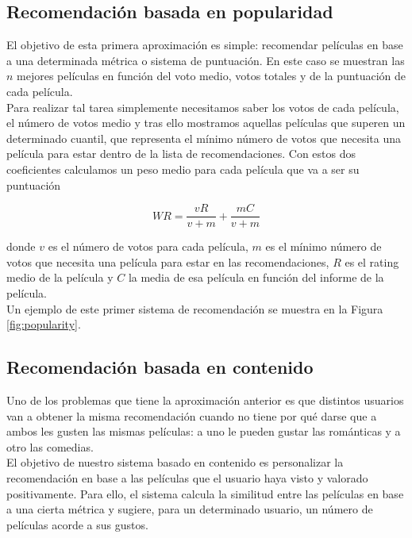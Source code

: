 	
		\subsection{Recomendación basada en popularidad}
	
			El objetivo de esta primera aproximación es simple: recomendar películas en base a una determinada métrica o sistema de puntuación. En este caso se muestran las $n$ mejores películas en función del voto medio, votos totales y de la puntuación de cada película. \\
			
			Para realizar tal tarea simplemente necesitamos saber los votos de cada película, el número de votos medio y tras ello mostramos aquellas películas que superen un determinado cuantil, que representa el mínimo número de votos que necesita una película para estar dentro de la lista de recomendaciones. Con estos dos coeficientes calculamos un peso medio para cada película que va a ser su puntuación
			
			$$ WR = \frac{v R}{v+m} + \frac{m C}{v+m} $$
			
			donde $v$ es el número de votos para cada película, $m$ es el mínimo número de votos que necesita una película para estar en las recomendaciones, $R$ es el rating medio de la película y $C$ la media de esa película en función del informe de la película. \\
			
			Un ejemplo de este primer sistema de recomendación se muestra en la Figura \ref{fig:popularity}.
			
		
		\subsection{Recomendación basada en contenido}
		
			Uno de los problemas que tiene la aproximación anterior es que distintos usuarios van a obtener la misma recomendación cuando no tiene por qué darse que a ambos les gusten las mismas películas: a uno le pueden gustar las románticas y a otro las comedias. \\
			
			El objetivo de nuestro sistema basado en contenido es personalizar la recomendación en base a las películas que el usuario haya visto y valorado positivamente. Para ello, el sistema calcula la similitud entre las películas en base a una cierta métrica y sugiere, para un determinado usuario, un número de películas acorde a sus gustos. \\
			
